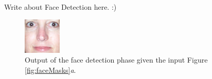 Write about Face Detection here. :)













\begin{figure}[H]
\centering
\includegraphics[width=0.16\textwidth]{img/fd2/output12.png}
\caption{Output of the face detection phase given the input Figure \ref{fig:faceMasks}\textit{a}.}
\label{fig:fdResult}
\end{figure}

